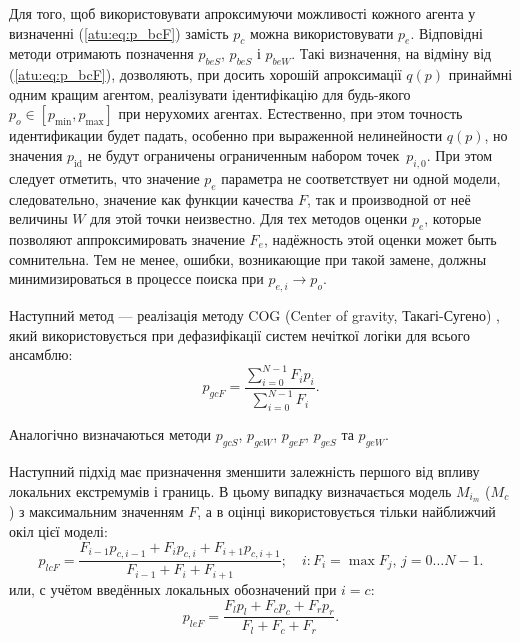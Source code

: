 Для того, щоб використовувати апроксимуючи можливості кожного агента у
визначенні (\ref{atu:eq:p_bcF}) замість $p_c$ можна використовувати $ p_e$.
Відповідні методи отримають позначення $p_{beS}$, $p_{beS} $ і $p_{beW}$.
Такі визначення, на відміну від (\ref{atu:eq:p_bcF}), дозволяють,
при досить хорошій апроксимації $q(p)$ принаймні одним кращим агентом,
реалізувати ідентифікацію для будь-якого
$p_o \in [p_{\min}, p_{\max}]$ при нерухомих агентах.
%
Естественно, при этом точность идентификации будет падать,
особенно при выраженной нелинейности $q(p)$, но значения $p_\mathrm{id}$
не будут ограничены ограниченным набором точек~$p_{i,0}$.
При этом следует отметить, что
значение $p_e$
параметра не соответствует ни одной модели,
следовательно,
значение как функции качества $F$,
так и производной от неё величины $W$
для этой точки неизвестно.
Для тех методов оценки $p_e$, которые позволяют аппроксимировать
значение $F_e$, надёжность этой оценки может быть сомнительна.
Тем не менее, ошибки, возникающие при такой замене,
должны минимизироваться в процессе поиска при $p_{e,i} \to p_o$.


Наступний метод --- реалізація методу COG (Center of gravity, Такагі-Сугено) \cite{atu_asau25,atu_csit2015,atu_asau16},
який використовується при дефазифікації систем нечіткої логіки для всього
ансамблю:
%
\begin{equation}
  p_{gcF}
  =
  \frac{\sum\limits_{i=0}^{N-1} F_{i} p_{i}}
       {\sum\limits_{i=0}^{N-1} F_{i} }
  .
  \label{atu:eq:p_gcF}
\end{equation}

Аналогічно визначаються методи
$p_{gcS}$,
$p_{gcW}$,
$p_{geF}$,
$p_{geS}$ та
$p_{geW}$.


Наступний підхід має призначення зменшити залежність першого від впливу локальних
екстремумів і границь. В цьому випадку визначається модель $M_{i_{m}}$ ($M_{c}$) з
максимальним значенням $F$, а в оцінці використовується тільки найближчий
окіл цієї моделі:
%
\begin{equation}
  p_{lcF}
  =
  \frac{ F_{i-1} p_{c,i-1} + F_{i} p_{c,i} + F_{i+1} p_{c,i+1} }
       { F_{i-1}           + F_{i}         + F_{i+1}         }
  ;
  \quad
  i : F_i = \max{F_j}, \, j=0 \ldots N-1 .
  \label{atu:eq:p_lcF}
\end{equation}
%
или, с учётом введённых локальных обозначений при $i=c$:
%
\begin{equation}
  p_{leF}
  =
  \frac{ F_{l} p_{l} + F_{c} p_{c} + F_{r} p_{r} }
       { F_{l}       + F_{c}       + F_{r}       }
  .
  \label{atu:eq:p_lcFl}
\end{equation}

